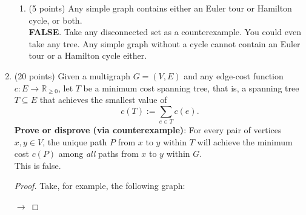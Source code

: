 \documentclass[11pt]{article}
\newcommand{\R}{\mathbb{R}}
\newcommand{\n}{\vspace{0.5cm}}
\begin{document}
\begin{enumerate}
\begin{enumerate}
        \item (5 points) Any simple graph contains either an Euler tour or Hamilton cycle, or both. \n\\
          \textbf{FALSE}.  Take any disconnected set as a counterexample.  You could even take any tree.  Any simple graph without a cycle cannot contain an Euler tour or a Hamilton cycle either.
      \end{enumerate}

      \newpage
    \item (20 points) Given a multigraph \(G = (V,E)\) and any edge-cost function \(c \colon E \to \R_{\geq 0}\), let \(T\) be a minimum cost spanning tree, that is, a spanning tree \(T \subseteq E\) that achieves the smallest value of 
      \[c(T) := \sum_{e \in T} c(e).\]
      \textbf{Prove or disprove (via counterexample)}: For every pair of vertices \(x,y \in V\), the unique path \(P\) from \(x\) to \(y\) within \(T\) will achieve the minimum cost \(c(P)\) among \textit{all} paths from \(x\) to \(y\) within \(G\). \n\\
      This is false.
      \begin{proof}
        Take, for example, the following graph:

        \begin{minipage}{0.4\textwidth}
          \centering
        \end{minipage} \(\longrightarrow\)
        \begin{minipage}{0.4\textwidth}
          \centering
\end{minipage}
\end{proof}
\end{enumerate}
\end{document}
